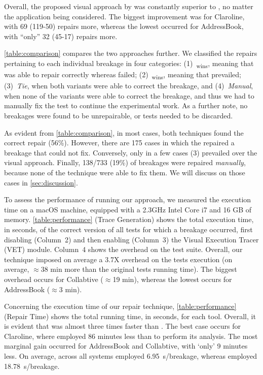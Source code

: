 Overall, the proposed visual approach by \tool was constantly superior to \water, no matter the application being considered. The biggest improvement was for Claroline, with 69 (119-50) repairs more, whereas the lowest occurred for AddressBook, with ``only'' 32 (45-17) repairs more. 

\autoref{table:comparison} compares the two approaches further. We classified the repairs pertaining to each individual breakage in four categories: (1)~\water\textsubscript{wins}, meaning that \water was able to repair correctly whereas \tool failed; (2)~\tool\textsubscript{wins}, meaning that \tool prevailed; (3)~\textit{Tie}, when both variants were able to correct the breakage, and (4)~\textit{Manual}, when none of the variants were able to correct the breakage, and thus we had to manually fix the test to continue the experimental work. As a further note, no breakages were found to be unrepairable, or tests needed to be discarded. 

As evident from \autoref{table:comparison}, in most cases, both techniques found the correct repair (56\%). However, there are 175 cases in which the \tool repaired a breakage that \water could not fix. Conversely, only in a few cases (3) \water prevailed over the visual approach. Finally, 138/733 (19\%) of breakages were repaired \textit{manually}, because none of the technique were able to fix them.
We will discuss on those cases in \autoref{sec:discussion}.

\label{sec:performance}
To assess the performance of running our approach, we measured the execution time on a macOS machine, equipped with a 2.3GHz Intel Core i7 and 16 GB of memory.
\autoref{table:performance} (Trace Generation) shows the total execution time, in seconds, of the correct version of all tests for which a breakage occurred, first disabling (Column~2) and then enabling (Column~3) the Visual Execution Tracer (VET) module. Column~4 shows the overhead on the test suite.
Overall, our technique imposed on average a 3.7X overhead on the tests execution (on average, $\approx$38 min more than the original tests running time). The biggest overhead occurs for Collabtive ($\approx$19 min), whereas the lowest occurs for AddressBook ($\approx$3 min). 

Concerning the execution time of our repair technique, \autoref{table:performance} (Repair Time) shows the total running time, in seconds, for each tool. Overall, it is evident that \tool was almost three times faster than \water. The best case occurs for Claroline, where \tool employed 86 minutes less than \water to perform its analysis. The most marginal gain occurred for AddressBook and Collabtive, with `only' 9 minutes less. 
On average, across all systems \tool employed 6.95~s/breakage, whereas \water employed 18.78~s/breakage.

